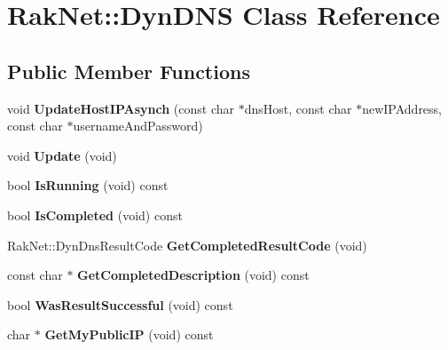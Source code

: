 \hypertarget{class_rak_net_1_1_dyn_d_n_s}{\section{Rak\-Net\-:\-:Dyn\-D\-N\-S Class Reference}
\label{class_rak_net_1_1_dyn_d_n_s}
}
\subsection*{Public Member Functions}
\begin{DoxyCompactItemize}
\item 
\hypertarget{class_rak_net_1_1_dyn_d_n_s_adb89ae61bea0ac94482daf80fbd1b461}{void {\bfseries Update\-Host\-I\-P\-Asynch} (const char $\ast$dns\-Host, const char $\ast$new\-I\-P\-Address, const char $\ast$username\-And\-Password)}\label{class_rak_net_1_1_dyn_d_n_s_adb89ae61bea0ac94482daf80fbd1b461}

\item 
\hypertarget{class_rak_net_1_1_dyn_d_n_s_ab3795e378f78fa254ad4819e9919b157}{void {\bfseries Update} (void)}\label{class_rak_net_1_1_dyn_d_n_s_ab3795e378f78fa254ad4819e9919b157}

\item 
\hypertarget{class_rak_net_1_1_dyn_d_n_s_a8d2ead455eabc2de7fe46890c5ca691e}{bool {\bfseries Is\-Running} (void) const }\label{class_rak_net_1_1_dyn_d_n_s_a8d2ead455eabc2de7fe46890c5ca691e}

\item 
\hypertarget{class_rak_net_1_1_dyn_d_n_s_a56ca24cfb2e20419eeaed6d16dbb796c}{bool {\bfseries Is\-Completed} (void) const }\label{class_rak_net_1_1_dyn_d_n_s_a56ca24cfb2e20419eeaed6d16dbb796c}

\item 
\hypertarget{class_rak_net_1_1_dyn_d_n_s_a8c35f0e8a3843395199e8131112e3668}{Rak\-Net\-::\-Dyn\-Dns\-Result\-Code {\bfseries Get\-Completed\-Result\-Code} (void)}\label{class_rak_net_1_1_dyn_d_n_s_a8c35f0e8a3843395199e8131112e3668}

\item 
\hypertarget{class_rak_net_1_1_dyn_d_n_s_acaefe9867e3d40f8c113828124a8ae4a}{const char $\ast$ {\bfseries Get\-Completed\-Description} (void) const }\label{class_rak_net_1_1_dyn_d_n_s_acaefe9867e3d40f8c113828124a8ae4a}

\item 
\hypertarget{class_rak_net_1_1_dyn_d_n_s_a11d6791e742f55180191765c8c09fb98}{bool {\bfseries Was\-Result\-Successful} (void) const }\label{class_rak_net_1_1_dyn_d_n_s_a11d6791e742f55180191765c8c09fb98}

\item 
\hypertarget{class_rak_net_1_1_dyn_d_n_s_a93cd360d2555bcbe099195a2ce04af17}{char $\ast$ {\bfseries Get\-My\-Public\-I\-P} (void) const }\label{class_rak_net_1_1_dyn_d_n_s_a93cd360d2555bcbe099195a2ce04af17}

\end{DoxyCompactItemize}
